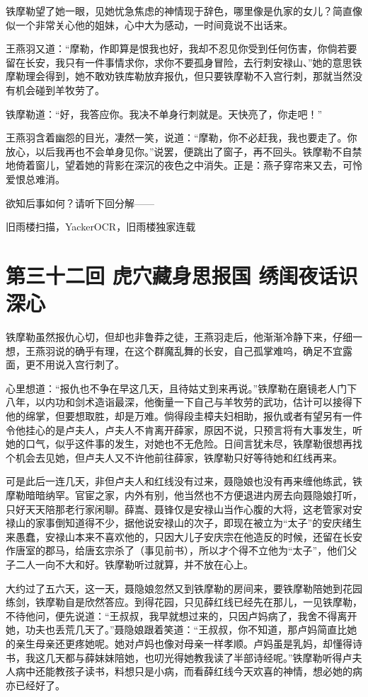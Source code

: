 \documentclass[12pt,oneside]{book}
\begin{document}
铁摩勒望了她一眼，见她忧急焦虑的神情现于辞色，哪里像是仇家的女儿？简直像似一个非常关心他的姐妹，心中大为感动，一时间竟说不出话来。

王燕羽又道：``摩勒，作即算是恨我也好，我却不忍见你受到任何伤害，你倘若要留在长安，我只有一件事情求你，求你不要孤身冒险，去行刺安禄山、''她的意思铁摩勒理会得到，她不敢劝铁库勒放弃报仇，但只要铁摩勒不入宫行刺，那就当然没有机会碰到羊牧劳了。

铁摩勒道：``好，我答应你。我决不单身行刺就是。天快亮了，你走吧！''

王燕羽含着幽怨的目光，凄然一笑，说道：``摩勒，你不必赶我，我也要走了。你放心，以后我再也不会单身见你。''说罢，便跳出了窗子，再不回头。铁摩勒不自禁地倚着窗儿，望着她的背影在深沉的夜色之中消失。正是：燕子穿帘来又去，可怜爱恨总难消。

欲知后事如何？请听下回分解------

旧雨楼扫描，YackerOCR，旧雨楼独家连载

\chapter{第三十二回 虎穴藏身思报国
绣闺夜话识深心}\label{ux7b2cux4e09ux5341ux4e8cux56de-ux864eux7a74ux85cfux8eabux601dux62a5ux56fd-ux7ee3ux95faux591cux8bddux8bc6ux6df1ux5fc3}

铁摩勒虽然报仇心切，但却也非鲁莽之徒，王燕羽走后，他渐渐冷静下来，仔细一想，王燕羽说的确乎有理，在这个群魔乱舞的长安，自己孤掌难呜，确足不宜露面，更不用说入宫行刺了。

心里想道：``报仇也不争在早这几天，且待姑丈到来再说。''铁摩勒在磨镜老人门下八年，以内功和剑术造诣最深，他衡量一下自己与羊牧劳的武功，估计可以接得下他的绵掌，但要想取胜，却是万难。倘得段圭樟夫妇相助，报仇或者有望另有一件令他挂心的是卢夫人，卢夫人不肯离开薛家，原因不说，只预言将有大事发生，听她的口气，似乎这件事的发生，对她也不无危险。日间言犹未尽，铁摩勒很想再找个机会去见她，但卢夫人又不许他前往薛家，铁摩勒只好等待她和红线再来。

可是此后一连几天，非但卢夫人和红线没有过来，聂隐娘也没有再来缠他练武，铁摩勒暗暗纳罕。官宦之家，内外有别，他当然也不方便退进内房去向聂隐娘打听，只好天天陪那老行家闲聊。薛嵩、聂锋仅是安禄山当作心腹的大将，这老管家对安禄山的家事倒知道得不少，据他说安禄山的次子，即现在被立为``太子''的安庆绪生来愚蠢，安禄山本来不喜欢他的，只因大儿子安庆宗在他造反的时候，还留在长安作唐室的郡马，给唐玄宗杀了（事见前书），所以才个得不立他为``太子''，他们父子二人一向不大和好。铁摩勒听过就算，并不放在心上。

大约过了五六天，这一天，聂隐娘忽然又到铁摩勒的房间来，要铁摩勒陪她到花园练剑，铁摩勒自是欣然答应。到得花园，只见薛红线已经先在那儿，一见铁摩勒，不待他问，便先说道：``王叔叔，我早就想过来的，只因卢妈病了，我舍不得离开她，功夫也丢荒几天了。''聂隐娘跟着笑道：``王叔叔，你不知道，那卢妈简直比她的亲生母亲还更疼她呢。她对卢妈也像对母亲一样孝顺。卢妈虽是乳妈，却懂得诗书，我这几天都与薛妹妹陪她，也叨光得她教我读了半部诗经呢。''铁摩勒听得卢夫人病中还能教孩子读书，料想只是小病，而看薛红线今天欢喜的神情，想必她的病亦已经好了。
\end{document}
